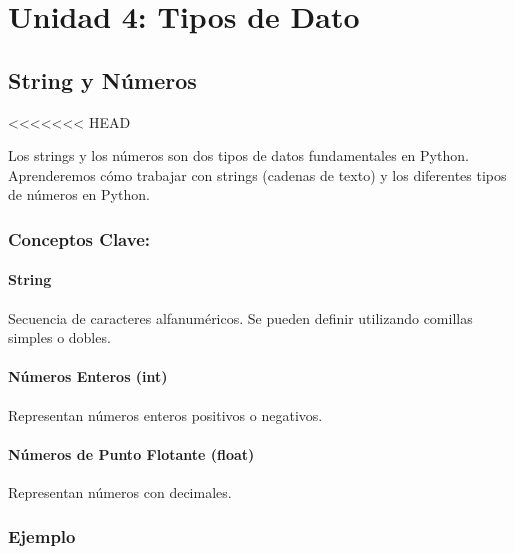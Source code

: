 \documentclass[
  a4paper,
  onepage,
  openany]{scrreprt}
\begin{document}
\part{Unidad 4: Tipos de Dato}

\hypertarget{string-y-nuxfameros}{%
\chapter{String y Números}\label{string-y-nuxfameros}}

\textless\textless\textless\textless\textless\textless\textless{} HEAD

Los strings y los números son dos tipos de datos fundamentales en
Python. Aprenderemos cómo trabajar con strings (cadenas de texto) y los
diferentes tipos de números en Python.

\hypertarget{conceptos-clave-16}{%
\section{Conceptos Clave:}\label{conceptos-clave-16}}

\hypertarget{string}{%
\subsection{String}\label{string}}

Secuencia de caracteres alfanuméricos. Se pueden definir utilizando
comillas simples o dobles.

\hypertarget{nuxfameros-enteros-int}{%
\subsection{Números Enteros (int)}\label{nuxfameros-enteros-int}}

Representan números enteros positivos o negativos.

\hypertarget{nuxfameros-de-punto-flotante-float}{%
\subsection{Números de Punto Flotante
(float)}\label{nuxfameros-de-punto-flotante-float}}

Representan números con decimales.

\hypertarget{ejemplo-16}{%
\section{Ejemplo}\label{ejemplo-16}}
\end{document}
